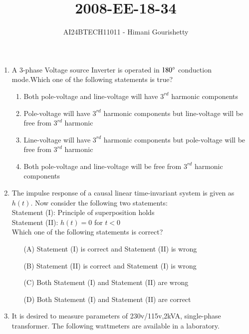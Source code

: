 \documentclass[journal,12pt,onecolumn]{IEEEtran}
\theoremstyle{remark}
\begin{document}

\vspace{3cm}

\title{2008-EE-18-34}
\author{AI24BTECH11011 - Himani Gourishetty}
\maketitle
\bigskip

\renewcommand{\thefigure}{\theenumi}
\renewcommand{\thetable}{\theenumi}
\begin{enumerate}
    \item A 3-phase Voltage source Inverter is operated in $180{\degree}$  conduction mode.Which one of the following statements is true?
    \begin{enumerate}
        \item Both pole-voltage and line-voltage will have $3^{rd}$ harmonic components
        \item Pole-voltage will have $3^{rd}$ harmonic components but line-voltage will be free from $3^{rd}$ harmonic
         \item Line-voltage will have $3^{rd}$ harmonic components but pole-voltage will be free from $3^{rd}$ harmonic
         \item  Both pole-voltage and line-voltage will be free from $3^{rd}$ harmonic components
    \end{enumerate}
    \item The impulse response of a causal linear time-invariant system is given as $h(t)$. Now consider the following two statements:\\
     Statement (I): Principle of superposition holds\\
     Statement (II): $h(t) = 0$ for $t < 0$\\
     Which one of the following statements is correct?
     \begin{enumerate}
    \item[(A)] Statement (I) is correct and Statement (II) is wrong
    \item[(B)] Statement (II) is correct and Statement (I) is wrong
    \item[(C)] Both Statement (I) and Statement (II) are wrong
    \item[(D)] Both Statement (I) and Statement (II) are correct
    \end{enumerate}
    \item It is desired to measure parameters of 230v/115v,2kVA, single-phase transformer. The following wattmeters are available in a laboratory.\\

\end{enumerate}
\end{document}
